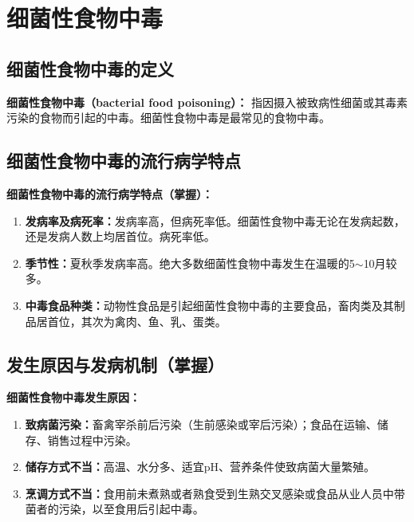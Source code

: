 \section{细菌性食物中毒}

\subsection{细菌性食物中毒的定义}

\begin{keybox}
\textbf{细菌性食物中毒（bacterial food poisoning）：}
指因摄入被致病性细菌或其毒素污染的食物而引起的中毒。细菌性食物中毒是最常见的食物中毒。
\end{keybox}

\subsection{细菌性食物中毒的流行病学特点}

\begin{keybox}
\textbf{细菌性食物中毒的流行病学特点（掌握）：}
\begin{enumerate}[leftmargin=*]
    \item \textbf{发病率及病死率：}发病率高，但病死率低。细菌性食物中毒无论在发病起数，还是发病人数上均居首位。病死率低。
    \item \textbf{季节性：}夏秋季发病率高。绝大多数细菌性食物中毒发生在温暖的5$\sim$10月较多。
    \item \textbf{中毒食品种类：}动物性食品是引起细菌性食物中毒的主要食品，畜肉类及其制品居首位，其次为禽肉、鱼、乳、蛋类。
\end{enumerate}
\end{keybox}

\subsection{发生原因与发病机制（掌握）}\difficulty

\begin{keybox}
\textbf{细菌性食物中毒发生原因：}
\begin{enumerate}[leftmargin=*]
    \item \textbf{致病菌污染：}畜禽宰杀前后污染（生前感染或宰后污染）；食品在运输、储存、销售过程中污染。
    \item \textbf{储存方式不当：}高温、水分多、适宜pH、营养条件使致病菌大量繁殖。
    \item \textbf{烹调方式不当：}食用前未煮熟或者熟食受到生熟交叉感染或食品从业人员中带菌者的污染，以至食用后引起中毒。
\end{enumerate}
\end{keybox}

